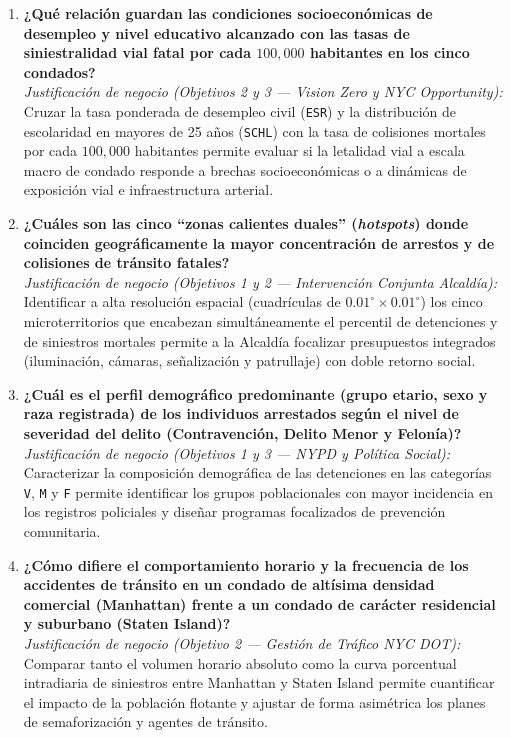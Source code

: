 \begin{enumerate}
    \item \textbf{¿Qué relación guardan las condiciones socioeconómicas de desempleo y nivel educativo alcanzado con las tasas de siniestralidad vial fatal por cada $100,000$ habitantes en los cinco condados?}\\
    \textit{Justificación de negocio (Objetivos 2 y 3 --- Vision Zero y NYC Opportunity):} Cruzar la tasa ponderada de desempleo civil (\texttt{ESR}) y la distribución de escolaridad en mayores de 25 años (\texttt{SCHL}) con la tasa de colisiones mortales por cada $100,000$ habitantes permite evaluar si la letalidad vial a escala macro de condado responde a brechas socioeconómicas o a dinámicas de exposición vial e infraestructura arterial.

    \item \textbf{¿Cuáles son las cinco ``zonas calientes duales'' (\textit{hotspots}) donde coinciden geográficamente la mayor concentración de arrestos y de colisiones de tránsito fatales?}\\
    \textit{Justificación de negocio (Objetivos 1 y 2 --- Intervención Conjunta Alcaldía):} Identificar a alta resolución espacial (cuadrículas de $0.01^\circ \times 0.01^\circ$) los cinco microterritorios que encabezan simultáneamente el percentil de detenciones y de siniestros mortales permite a la Alcaldía focalizar presupuestos integrados (iluminación, cámaras, señalización y patrullaje) con doble retorno social.

    \item \textbf{¿Cuál es el perfil demográfico predominante (grupo etario, sexo y raza registrada) de los individuos arrestados según el nivel de severidad del delito (Contravención, Delito Menor y Felonía)?}\\
    \textit{Justificación de negocio (Objetivos 1 y 3 --- NYPD y Política Social):} Caracterizar la composición demográfica de las detenciones en las categorías \texttt{V}, \texttt{M} y \texttt{F} permite identificar los grupos poblacionales con mayor incidencia en los registros policiales y diseñar programas focalizados de prevención comunitaria.

    \item \textbf{¿Cómo difiere el comportamiento horario y la frecuencia de los accidentes de tránsito en un condado de altísima densidad comercial (Manhattan) frente a un condado de carácter residencial y suburbano (Staten Island)?}\\
    \textit{Justificación de negocio (Objetivo 2 --- Gestión de Tráfico NYC DOT):} Comparar tanto el volumen horario absoluto como la curva porcentual intradiaria de siniestros entre Manhattan y Staten Island permite cuantificar el impacto de la población flotante y ajustar de forma asimétrica los planes de semaforización y agentes de tránsito.


\end{enumerate}
